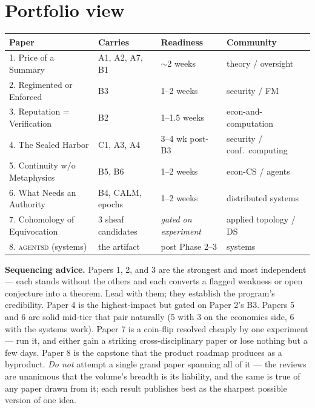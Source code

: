 \documentclass[11pt,a4paper]{article}
\begin{document}
\section{Portfolio view}
\begin{longtable}{@{}p{}p{}p{}p{}@{}}
\toprule
\textbf{Paper} & \textbf{Carries} & \textbf{Readiness} & \textbf{Community} \\
\midrule
1. Price of a Summary & A1, A2, A7, B1 & $\sim$2 weeks & theory / oversight \\
2. Regimented or Enforced & B3 & 1--2 weeks & security / FM \\
3. Reputation = Verification & B2 & 1--1.5 weeks & econ-and-computation \\
4. The Sealed Harbor & C1, A3, A4 & 3--4 wk post-B3 & security / conf.\ computing \\
5. Continuity w/o Metaphysics & B5, B6 & 1--2 weeks & econ-CS / agents \\
6. What Needs an Authority & B4, CALM, epochs & 1--2 weeks & distributed systems \\
7. Cohomology of Equivocation & 3 sheaf candidates & \emph{gated on experiment} & applied topology / DS \\
8. \textsc{agentsd} (systems) & the artifact & post Phase 2--3 & systems \\
\bottomrule
\end{longtable}

\noindent\textbf{Sequencing advice.} Papers 1, 2, and 3 are the strongest and most independent --- each stands without the others and each converts a flagged weakness or open conjecture into a theorem. Lead with them; they establish the program's credibility. Paper 4 is the highest-impact but gated on Paper 2's B3. Papers 5 and 6 are solid mid-tier that pair naturally (5 with 3 on the economics side, 6 with the systems work). Paper 7 is a coin-flip resolved cheaply by one experiment --- run it, and either gain a striking cross-disciplinary paper or lose nothing but a few days. Paper 8 is the capstone that the product roadmap produces as a byproduct. \emph{Do not} attempt a single grand paper spanning all of it --- the reviews are unanimous that the volume's breadth is its liability, and the same is true of any paper drawn from it; each result publishes best as the sharpest possible version of one idea.
\end{document}
